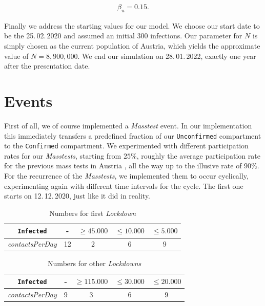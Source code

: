 \documentclass
[
    report,
    11pt,
    bibliography = totoc,
    listof = totoc,
    headinclude = true,
]
{scrreport}
\begin{document}
\begin{align*}
  \beta_u = 0.15.
\end{align*}

Finally we address the starting values for our model. We choose our start date
to be the 25.\,02.\,2020 and assumed an initial 300 infections.
Our parameter for $N$ is simply chosen as the current population of Austria,
which yields the approximate value of $N = 8,900,000$.
We end our simulation on 28.\,01.\,2022, exactly one year after the presentation date.

\section{Events}

First of all, we of course implemented a \textit{Masstest} event. In our implementation
this immediately transfers a predefined fraction of our \texttt{Unconfirmed} compartment
to the \texttt{Confirmed} compartment. We experimented with different participation rates
for our \textit{Masstests}, starting from $25\%$, roughly the average participation rate
for the previous mass tests in Austria \cite{MassTests}, all the way up to the illusive rate of $90\%$.
For the recurrence of the \textit{Masstests}, we implemented them to occur cyclically,
experimenting again with different time intervals for the cycle. The first one
starts on 12.\,12.\,2020, just like it did in reality.\\

\begin{table}[!h]
  \begin{center}
  \begin{tabular}{|c||c|c|c|c|}
  \hline
    \texttt{Infected} &- & $\geq 45.000$ & $\leq 10.000$ & $\leq 5.000$ \\
    \hline
    \textit{contactsPerDay} & 12 & 2 & 6 & 9 \\
    \hline
  \end{tabular}
  \end{center}
  \caption{Numbers for first \textit{Lockdown}}
\end{table}

\begin{table}[!h]
  \begin{center}
  \begin{tabular}{|c||c|c|c|c|}
  \hline
    \texttt{Infected} &- & $\geq 115.000$ & $\leq 30.000$ & $\leq 20.000$ \\
    \hline
    \textit{contactsPerDay} & 9 & 3 & 6 & 9 \\
    \hline
  \end{tabular}
  \end{center}
  \caption{Numbers for other \textit{Lockdowns}}
\end{table}
\end{document}
